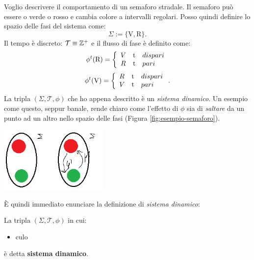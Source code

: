 \begin{example}[Semaforo]
    \label{ex:semaforo}
    Voglio descrivere il comportamento di un semaforo stradale.
    Il semaforo può essere o verde o rosso e cambia colore a intervalli regolari.
    Posso quindi definire lo spazio delle fasi del sistema come:
    \begin{equation*}
        \Sigma := \{\text{V}, \text{R} \}.
    \end{equation*}
    Il tempo è discreto: $\mathcal T \equiv \mathbb{Z}^+$ e il flusso di fase è definito come:
    \begin{equation*}
         \phi^t(\text R) = \left\{
         \begin{array}{lrl}
             V &$t$ &dispari\\
             R &$t$ &pari
         \end{array}
         \right.
    \end{equation*}
    \begin{equation*}
        \phi^t(\text V) = \left\{
        \begin{array}{lrl}
            R &$t$ &dispari\\
            V &$t$ &pari
        \end{array}
        \right.
        .
    \end{equation*}
    La tripla $(\Sigma, \mathcal T, \phi)$ che ho appena descritto è un \emph{sistema dinamico}.
    Un esempio come questo, seppur banale, rende chiaro come l'effetto di $\phi$ sia
    di \emph{saltare} da un punto ad un altro nello spazio delle fasi (Figura \ref{fig:esempio-semaforo}).

    \begin{center}
        \includegraphics[width=0.4\textwidth]{assets/ex-semaforo.png}
        \label{fig:esempio-semaforo}
    \end{center}
\end{example}

È quindi immediato enunciare la definizione di \emph{sistema dinamico}:

\begin{definition}
    La tripla $(\Sigma, \mathcal T, \phi)$ in cui:
    \begin{itemize}
        \item culo
    \end{itemize}
    è detta \textbf{sistema dinamico}.
\end{definition}

